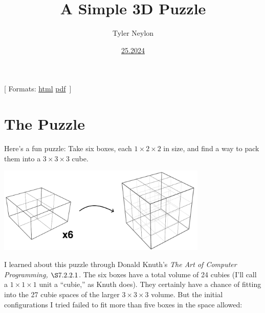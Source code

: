\documentclass[
]{article}
\title{A Simple 3D Puzzle}
\author{Tyler Neylon}
\date{\href{https://tylerneylon.com/a/7date/}{25.2024}}
\newcommand{\class}[1]{}
\newcommand{\optquad}{\quad}
\newcommand{\smallscrneg}{}
\newcommand{\smallscr}[1]{}
\newcommand{\bigscr}[1]{#1}
\newcommand{\smallscrskip}[1]{}
\begin{document}
\maketitle

\newcommand{\R}{\mathbb{R}}
\newcommand{\N}{\mathbb{N}}
\newcommand{\eqnset}[1]{\left.\mbox{$#1$}\;\;\right\rbrace\class{postbrace}{ }}
\providecommand{\latexonlyrule}[3][]{}
\providecommand{\optquad}{\class{optquad}{}}
\providecommand{\smallscrneg}{\class{smallscrneg}{ }}
\providecommand{\bigscr}[1]{\class{bigscr}{#1}}
\providecommand{\smallscr}[1]{\class{smallscr}{#1}}
\providecommand{\smallscrskip}[1]{\class{smallscrskip}{\hskip #1}}

\newcommand{\mydots}{{\cdot}\kern -0.1pt{\cdot}\kern -0.1pt{\cdot}}

\newcommand{\?}{\stackrel{?}{=}}
\newcommand{\sign}{\textsf{sign}}
\newcommand{\order}{\textsf{order}}
\newcommand{\flips}{\textsf{flips}}
\newcommand{\samecycles}{\textsf{same$\\\_$cycles}}
\newcommand{\canon}{\textsf{canon}}
\newcommand{\cs}{\mathsf{cs}}
\newcommand{\dist}{\mathsf{dist}}
\renewcommand{\theenumi}{(\roman{enumi})}

{[} Formats:
\href{http://tylerneylon.com/a/lego_puzzle/lego_puzzle.html}{html}
\textbar{}
\href{http://tylerneylon.com/a/lego_puzzle/lego_puzzle.pdf}{pdf}
\(\,\){]}

\hypertarget{the-puzzle}{%
\section{The Puzzle}\label{the-puzzle}}

Here's a fun puzzle: Take six boxes, each \(1\times 2\times 2\) in size,
and find a way to pack them into a \(3\times 3\times 3\) cube.

\begin{center}\includegraphics[width=0.75\textwidth,height=\textheight]{img/img1.pdf}\end{center}

I learned about this puzzle through Donald Knuth's \emph{The Art of
Computer Programming,} \(\S 7.2.2.1\). The six boxes have a total volume
of 24 cubies (I'll call a \(1\times 1\times 1\) unit a ``cubie,'' as
Knuth does). They certainly have a chance of fitting into the 27 cubie
spaces of the larger \(3\times 3\times 3\) volume. But the initial
configurations I tried failed to fit more than five boxes in the space
allowed:
\end{document}
